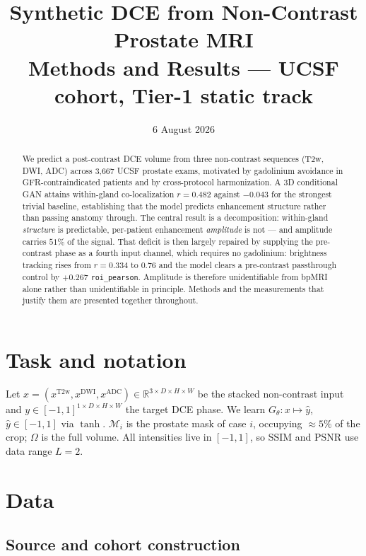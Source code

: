 \documentclass[11pt]{article}
\title{Synthetic DCE from Non-Contrast Prostate MRI\\[2pt]
       \large Methods and Results --- UCSF cohort, Tier-1 static track}
\author{}
\date{6 August 2026}
\newcommand{\yhat}{\hat{y}}
\newcommand{\roi}{\mathcal{M}}
\newcommand{\1}{\mathbb{1}}
\begin{document}
\maketitle
\vspace{-2.5em}

\begin{abstract}
\noindent
We predict a post-contrast DCE volume from three non-contrast sequences (T2w, DWI, ADC)
across 3{,}667 UCSF prostate exams, motivated by gadolinium avoidance in
GFR-contraindicated patients and by cross-protocol harmonization. A 3D conditional GAN
attains within-gland co-localization $r=0.482$ against $-0.043$ for the strongest trivial
baseline, establishing that the model predicts enhancement structure rather than passing
anatomy through. The central result is a decomposition: within-gland \emph{structure} is
predictable, per-patient enhancement \emph{amplitude} is not --- and amplitude carries
$51\%$ of the signal. That deficit is then largely repaired by supplying the pre-contrast
phase as a fourth input channel, which requires no gadolinium: brightness tracking rises from
$r=0.334$ to $0.76$ and the model clears a pre-contrast passthrough control by $+0.267$
\texttt{roi\_pearson}. Amplitude is therefore unidentifiable from bpMRI alone rather than
unidentifiable in principle. Methods and the measurements that justify them are presented
together throughout.
\end{abstract}

\tableofcontents
\vspace{1em}

\section{Task and notation}

Let $x=(x^{\text{T2w}},x^{\text{DWI}},x^{\text{ADC}})\in\mathbb{R}^{3\times D\times H\times W}$
be the stacked non-contrast input and $y\in[-1,1]^{1\times D\times H\times W}$ the target DCE
phase. We learn $G_\theta:x\mapsto\yhat$, $\yhat\in[-1,1]$ via $\tanh$. $\roi_i$ is the
prostate mask of case $i$, occupying $\approx5\%$ of the crop; $\Omega$ is the full volume.
All intensities live in $[-1,1]$, so SSIM and PSNR use data range $L=2$.

\section{Data}

\subsection{Source and cohort construction}
\end{document}
